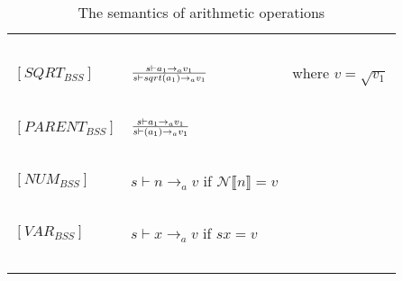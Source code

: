 \begin{table}[h]
\begin{tabular}{|l|l|l|}
			~			&															~																			& ~ \\
	$[SQRT_{BSS}]$		& $s \vdash a_{1} \rightarrow_{a} v_{1} \over s \vdash sqrt(a_{1}) \rightarrow_{a} v_{1}$												& where $v = \sqrt{v_{1}}$ \\
			~			&															~																			& ~ \\
	$[PARENT_{BSS}]$	& $s \vdash a_{1} \rightarrow_{a} v_{1} \over s \vdash (a_{1}) \rightarrow_{a} v_{1}$													& ~ \\
			~			&															~																			& ~ \\
	$[NUM_{BSS}]$		& $s \vdash n \rightarrow_{a} v$  if  $\mathcal{N}\llbracket n \rrbracket = v$															& ~ \\
			~			&															~																			& ~ \\
	$[VAR_{BSS}]$		& $s \vdash x \rightarrow_{a} v$  if  $sx = v$														   									& ~ \\
			~			&															~																			& ~ \\
	\hline
	\end{tabular}
	\label{tab:semantics_aritmethic}
	\caption{The semantics of arithmetic operations}
\end{table}

